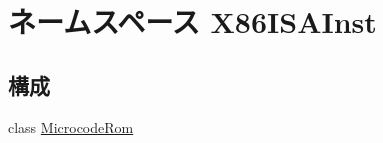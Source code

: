 \hypertarget{namespaceX86ISAInst}{
\section{ネームスペース X86ISAInst}
\label{namespaceX86ISAInst}
}
\subsection*{構成}
\begin{DoxyCompactItemize}
\item 
class \hyperlink{classX86ISAInst_1_1MicrocodeRom}{MicrocodeRom}
\end{DoxyCompactItemize}
